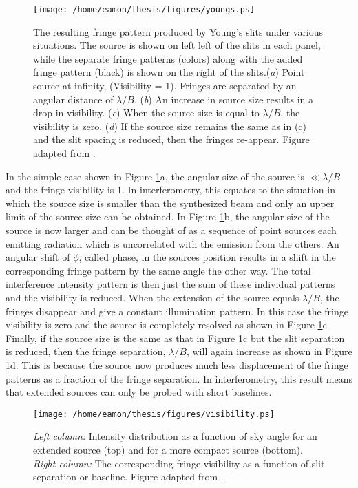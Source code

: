 \begin{figure}[hbt!]
\centering 
          \texttt{[image: /home/eamon/thesis/figures/youngs.ps]}
\caption[Fringe pattern produced by Young's slits under various situations.]{The resulting fringe pattern produced by Young's slits under various situations. The source is shown on left left of the slits in each panel, while the separate fringe patterns (colors) along with the added fringe pattern (black) is shown on the right of the slits.(\textit{a}) Point source at infinity, (Visibility = 1). Fringes are separated by an angular distance of $\lambda /B$. (\textit{b}) An increase in source size results in a drop in visibility. (\textit{c}) When the source size is equal to $\lambda /B$, the visibility is zero. (\textit{d}) If the source size remains the same as in (c) and the slit spacing is reduced, then the fringes re-appear. Figure adapted from \cite{jackson_2008}.}
\label{fig2e}
\end{figure}

In the simple case shown in Figure \ref{fig2e}a, the angular size of the source is  $\ll \lambda/B$ and the fringe visibility is 1. In interferometry, this equates to the situation in which the source size is smaller than the synthesized beam and only an upper limit of the source size can be obtained. In Figure \ref{fig2e}b, the angular size of the source is now larger and can be thought of as a sequence of point sources each emitting radiation which is uncorrelated with the emission from the others. An angular shift of $\phi$, called phase, in the sources position results in a shift in the corresponding fringe pattern by the same angle the other way. The total interference intensity pattern is then just the sum of these individual patterns and the visibility is reduced. When the extension of the source equals $\lambda/B$, the fringes disappear and give a constant illumination pattern. In this case the fringe visibility is zero and the source is completely resolved as shown in Figure \ref{fig2e}c. Finally, if the source size is the same as that in Figure \ref{fig2e}c but the slit separation is reduced, then the fringe separation, $\lambda/B$, will again increase as shown in Figure \ref{fig2e}d. This is because the source now produces much less displacement of the fringe patterns as a fraction of the fringe separation. In interferometry, this result means that extended sources can only be probed with short baselines. 

\begin{figure}[hbt!]
\centering 
          \texttt{[image: /home/eamon/thesis/figures/visibility.ps]}
\caption[Visibilities for various source sizes.]{\textit{Left column:} Intensity distribution as a function of sky angle for an extended source (top) and for a more compact source (bottom). \textit{Right column:} The corresponding fringe visibility as a function of slit separation or baseline. Figure adapted from \cite{jackson_2008}.}
\label{fig2f}
\end{figure}

